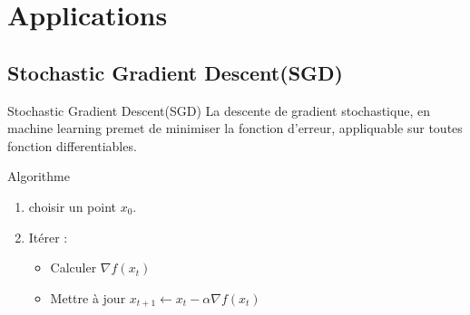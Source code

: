 \documentclass{beamer}
\begin{document}
\section{Applications}
\subsection{Stochastic Gradient Descent(SGD)}
  \begin{frame}{Stochastic Gradient Descent(SGD)}
La descente de gradient stochastique, en machine learning premet de minimiser la fonction d'erreur, appliquable sur toutes fonction differentiables.\newline
\begin{block}{Algorithme}
\begin{enumerate}
	\item{choisir un point $x_0$.}
	\item{Itérer : 
\begin{itemize}
	\item{Calculer $\nabla f(x_t)$ }
	\item{Mettre à jour $x_{t+1}\leftarrow x_t - \alpha \nabla f(x_t)$}
\end{itemize}
	}
\end{enumerate}
\end{block}
\end{frame}
\end{document}
